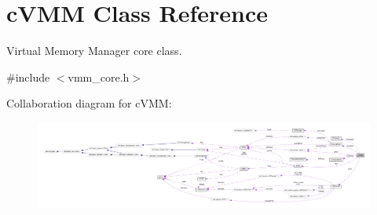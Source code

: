 \hypertarget{classcVMM}{\section{c\-V\-M\-M \-Class \-Reference}
\label{dc/de5/classcVMM}
}


\-Virtual \-Memory \-Manager core class.  




{\ttfamily \#include $<$vmm\-\_\-core.\-h$>$}



\-Collaboration diagram for c\-V\-M\-M\-:
\nopagebreak
\begin{figure}[H]
\begin{center}
\leavevmode
\includegraphics[width=350pt]{de/d7e/classcVMM__coll__graph}
\end{center}
\end{figure}

